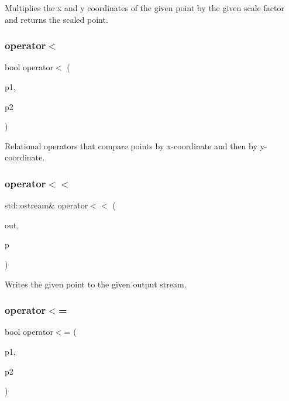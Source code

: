 Multiplies the x and y coordinates of the given point by the given scale factor and returns the scaled point. 

\mbox{\label{structGPoint_a8ef7ca0053558918c5f7bcae257c1bec}} 
\subsubsection{\texorpdfstring{operator$<$}{operator<}}
{\footnotesize\ttfamily bool operator$<$ (\begin{DoxyParamCaption}\item[{const \mbox{\hyperlink{structGPoint}{G\+Point}} \&}]{p1,  }\item[{const \mbox{\hyperlink{structGPoint}{G\+Point}} \&}]{p2 }\end{DoxyParamCaption})\hspace{0.3cm}{\ttfamily [friend]}}



Relational operators that compare points by x-\/coordinate and then by y-\/coordinate. 

\mbox{\label{structGPoint_aa8890c3cbec1c39bac51117875950b01}} 
\subsubsection{\texorpdfstring{operator$<$$<$}{operator<<}}
{\footnotesize\ttfamily std\+::ostream\& operator$<$$<$ (\begin{DoxyParamCaption}\item[{std\+::ostream \&}]{out,  }\item[{const \mbox{\hyperlink{structGPoint}{G\+Point}} \&}]{p }\end{DoxyParamCaption})\hspace{0.3cm}{\ttfamily [friend]}}



Writes the given point to the given output stream. 

\mbox{\label{structGPoint_a5b9606369659c394b2494828cb199b91}} 
\subsubsection{\texorpdfstring{operator$<$=}{operator<=}}
{\footnotesize\ttfamily bool operator$<$= (\begin{DoxyParamCaption}\item[{const \mbox{\hyperlink{structGPoint}{G\+Point}} \&}]{p1,  }\item[{const \mbox{\hyperlink{structGPoint}{G\+Point}} \&}]{p2 }\end{DoxyParamCaption})\hspace{0.3cm}{\ttfamily [friend]}}



